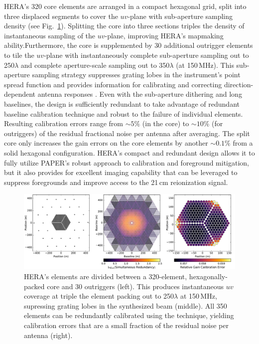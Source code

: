 \documentclass[preprint,11pt]{aastex}
\begin{document}
HERA's 320 core elements are arranged in a compact hexagonal grid, split into three displaced segments to cover the $uv$-plane with sub-aperture sampling density (see Fig.~\ref{fig:arrayConfig}). Splitting the core into three sections triples the density of instantaneous sampling of the $uv$-plane, improving HERA's mapmaking ability.Furthermore, the core is supplemented by 30 additional outrigger elements to tile the $uv$-plane with instantaneously complete sub-aperture sampling out to 250$\lambda$ and complete aperture-scale sampling out to 350$\lambda$ (at 150\,MHz). 
This sub-aperture sampling strategy suppresses grating lobes in the instrument's point spread function and provides information for calibrating and correcting direction-dependent antenna responses \citep{dillon_parsons2016}.
Even with the sub-aperture dithering and long baselines, the design is sufficiently redundant to take advantage of redundant baseline calibration technique and robust to the failure of individual elements.
Resulting calibration errors range from $\sim 5\%$ (in the core) to $\sim 10\%$ (for outriggers) of the residual fractional noise per antenna after averaging. 
The split core only increases the gain errors on the core elements by another $\sim 0.1\%$ from a solid hexagonal configuration. HERA's compact and redundant design allows it to fully utilize PAPER's robust approach to calibration and foreground mitigation, but it also provides for excellent imaging capability that can be leveraged to suppress foregrounds and improve access to the 21\,cm reionization signal.

\begin{figure}[h]
	\centering
	\vspace{-5pt}
	\includegraphics[width=1\textwidth,clip]{plots/HERA_Array_Config.pdf}
	\vspace{-25pt}
	\caption{HERA's elements are divided between a 320-element, hexagonally-packed core and 30 outriggers (left). This produces instantaneous
$uv$ coverage at triple the element packing out to 250$\lambda$ at 150\,MHz, supressing grating lobes in the synthesized beam (middle). All 350 elements can be redundantly calibrated 
using the \citet{liu_et_al2010} technique, yielding calibration errors that are a small fraction of the residual noise per antenna (right).}
		\label{fig:arrayConfig}
			\vspace{-10pt}
\end{figure}
\end{document}
